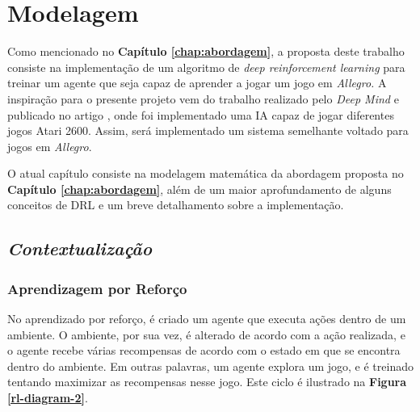 \chapter{Modelagem}
\label{chap:model}

Como mencionado no \textbf{Capítulo \ref{chap:abordagem}}, a proposta deste trabalho consiste na implementação de um algoritmo de \textit{deep reinforcement learning} para treinar um agente que seja capaz de aprender a jogar um jogo em \textit{Allegro.} A inspiração para o presente projeto vem do trabalho realizado pelo \textit{Deep Mind} e publicado no artigo \cite{play-atari-drl-deepmind}, onde foi implementado uma IA capaz de jogar diferentes jogos Atari 2600. Assim, será implementado um sistema semelhante voltado para jogos em \textit{Allegro}.

O atual capítulo consiste na modelagem matemática da abordagem proposta no \textbf{Capítulo \ref{chap:abordagem}}, além de um maior aprofundamento de alguns conceitos de DRL e um breve detalhamento sobre a implementação.

\section{\textit{Contextualização}} %
\label{sec:contextualizacao}

\subsection{Aprendizagem por Reforço}

No aprendizado por reforço, é criado um agente que executa ações dentro de um ambiente. O ambiente, por sua vez, é alterado de acordo com a ação realizada, e o agente recebe várias recompensas de acordo com o estado em que se encontra dentro do ambiente. Em outras palavras, um agente explora um jogo, e é treinado tentando maximizar as recompensas nesse jogo. Este ciclo é ilustrado na \textbf{Figura \ref{rl-diagram-2}}.

